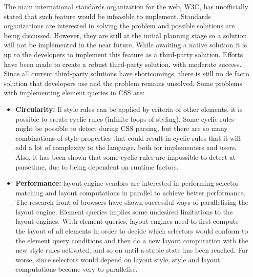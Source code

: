 \documentclass[a4paper,11pt]{kth-mag}
\begin{document}
      The main international standards organization for the \gls{web}, \gls{W3C}, has unofficially stated that such feature would be infeasible to implement.
      Standards organizations are interested in solving the problem and possible solutions are being discussed.
      However, they are still at the initial planning stage so a solution will not be implemented  in the near future.
      While awaiting a \gls{native} solution it is up to the developers to implement this feature as a \gls{third-party} solution.
      Efforts have been made to create a robust \gls{third-party} solution, with moderate success.
      Since all current \gls{third-party} solutions have shortcomings, there is still no de facto solution that developers use and the problem remains unsolved.
      Some problems with implementing element queries  in \gls{CSS} are:
      \begin{itemize}
        \item \textbf{Circularity:}
        If style rules can be applied by criteria of other \glspl{element}, it is possible to create cyclic rules (infinite loops of styling).
        Some cyclic rules might be possible to detect during \gls{CSS} parsing, but there are so many combinations of style properties that could result in cyclic rules that it will add a lot of complexity to the language, both for implementers and users.
        Also, it has been shown that some cyclic rules are impossible to detect at parsetime, due to being dependent on runtime factors.
        \item \textbf{Performance:} 
        \Gls{layout engine} vendors are interested in performing selector matching and layout computations in parallel to achieve better performance.
        The research front of \glspl{browser} have shown successful ways of parallelising the \gls{layout engine}.
        Element queries implies some undesired limitations to the \glspl{layout engine}.
        With element queries, \glspl{layout engine} need to first compute the layout of all \glspl{element} in order to decide which selectors would conform to the element query conditions and then do a new layout computation with the new style rules activated, and so on until a stable state has been reached.
        Far worse, since selectors would depend on layout style, style and layout computations become very to parallelise.
      \end{itemize}
\end{document}

